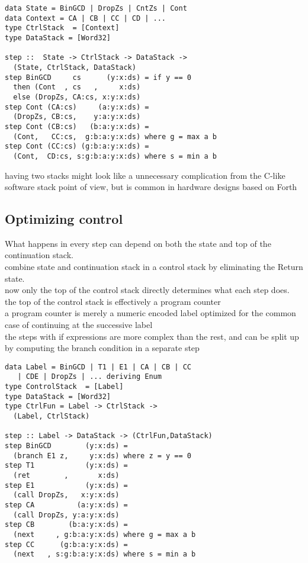 \documentclass[preprint]{sigplanconf}
\begin{document}
\begin{lstlisting}
data State = BinGCD | DropZs | CntZs | Cont
data Context = CA | CB | CC | CD | ...
type CtrlStack  = [Context]
type DataStack = [Word32]

step ::  State -> CtrlStack -> DataStack ->
  (State, CtrlStack, DataStack)
step BinGCD     cs      (y:x:ds) = if y == 0
  then (Cont  , cs   ,     x:ds)
  else (DropZs, CA:cs, x:y:x:ds)
step Cont (CA:cs)     (a:y:x:ds) = 
  (DropZs, CB:cs,    y:a:y:x:ds)
step Cont (CB:cs)   (b:a:y:x:ds) = 
  (Cont,   CC:cs,  g:b:a:y:x:ds) where g = max a b
step Cont (CC:cs) (g:b:a:y:x:ds) = 
  (Cont,  CD:cs, s:g:b:a:y:x:ds) where s = min a b
\end{lstlisting}

having two stacks might look like a unnecessary complication from the C-like software stack point of view, but is common in hardware designs based on Forth \cite{LaForest}

\subsection{Optimizing control}

What happens in every step can depend on both the state and top of the continuation stack. \\
combine state and continuation stack in a control stack by eliminating the Return state. \\
now only the top of the control stack directly determines what each step does. \\
the top of the control stack is effectively a program counter \\
a program counter is merely a numeric encoded label optimized for the common case of continuing at the successive label \\
the steps with if expressions are more complex than the rest, and can be split up by computing the branch condition in a separate step

\begin{lstlisting}
data Label = BinGCD | T1 | E1 | CA | CB | CC
   | CDE | DropZs | ... deriving Enum
type ControlStack  = [Label]
type DataStack = [Word32]
type CtrlFun = Label -> CtrlStack -> 
  (Label, CtrlStack)

step :: Label -> DataStack -> (CtrlFun,DataStack)
step BinGCD        (y:x:ds) =
  (branch E1 z,     y:x:ds) where z = y == 0
step T1            (y:x:ds) = 
  (ret        ,       x:ds)
step E1            (y:x:ds) = 
  (call DropZs,   x:y:x:ds)
step CA          (a:y:x:ds) = 
  (call DropZs, y:a:y:x:ds)
step CB        (b:a:y:x:ds) = 
  (next     , g:b:a:y:x:ds) where g = max a b
step CC      (g:b:a:y:x:ds) = 
  (next   , s:g:b:a:y:x:ds) where s = min a b
\end{lstlisting}
\end{document}

